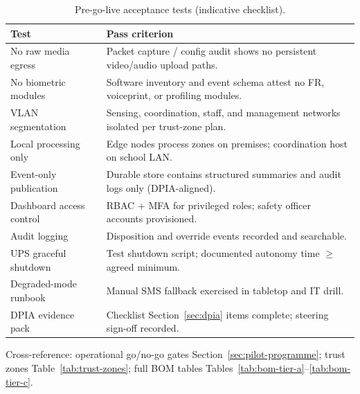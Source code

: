 \begin{table}[htbp]
  \centering
  \caption{Pre-go-live acceptance tests (indicative checklist).}
  \label{tab:acceptance-tests}
  \small
  \begin{tabular}{@{}p{4.2cm}p{7.8cm}@{}}
    \toprule
    Test & Pass criterion \\
    \midrule
    No raw media egress &
      Packet capture / config audit shows no persistent video/audio upload paths. \\
    No biometric modules &
      Software inventory and event schema attest no FR, voiceprint, or profiling modules. \\
    VLAN segmentation &
      Sensing, coordination, staff, and management networks isolated per trust-zone plan. \\
    Local processing only &
      Edge nodes process zones on premises; coordination host on school LAN. \\
    Event-only publication &
      Durable store contains structured summaries and audit logs only (DPIA-aligned). \\
    Dashboard access control &
      RBAC + MFA for privileged roles; safety officer accounts provisioned. \\
    Audit logging &
      Disposition and override events recorded and searchable. \\
    UPS graceful shutdown &
      Test shutdown script; documented autonomy time $\geq$ agreed minimum. \\
    Degraded-mode runbook &
      Manual SMS fallback exercised in tabletop and IT drill. \\
    DPIA evidence pack &
      Checklist Section~\ref{sec:dpia} items complete; steering sign-off recorded. \\
    \bottomrule
  \end{tabular}
\end{table}

Cross-reference: operational go/no-go gates Section~\ref{sec:pilot-programme}; trust zones
Table~\ref{tab:trust-zones}; full BOM tables
Tables~\ref{tab:bom-tier-a}--\ref{tab:bom-tier-c}.
